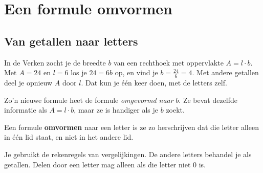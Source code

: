 \begin{oefeningen}[Start]

\end{oefeningen}

\section{Een formule omvormen}

\subsection{Van getallen naar letters}

In de Verken zocht je de breedte $b$ van een rechthoek met oppervlakte $A = l \cdot b$. Met $A = 24$ en $l = 6$ los je $24 = 6b$ op, en vind je $b = \tfrac{24}{6} = 4$. Met andere getallen deel je opnieuw $A$ door $l$. Dat kun je één keer doen, met de letters zelf.


Zo'n nieuwe formule heet de formule \textit{omgevormd naar} $b$. Ze bevat dezelfde informatie als $A = l \cdot b$, maar ze is handiger als je $b$ zoekt.

\begin{theorie}
Een formule \textbf{\textcolor{accent}{omvormen}} naar een letter is ze zo herschrijven dat die letter alleen in één lid staat, en niet in het andere lid.

\vspace{1mm}
Je gebruikt de rekenregels van vergelijkingen. De andere letters behandel je als getallen. Delen door een letter mag alleen als die letter niet 0 is.
\end{theorie}

